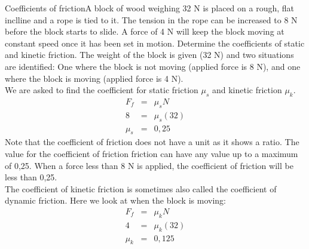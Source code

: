 \begin{wex}{Coefficients of friction}{A block of wood weighing 32 N is placed on a rough, flat inclline and a rope is tied to it. The tension in the rope can be increased to 8 N before the block starts to slide. A force of 4 N will keep the block moving at constant speed once it has been set in motion. Determine the coefficients of static and kinetic friction.}
{
The weight of the block is given (32 N) and two situations are identified: One where the block is not moving (applied force is 8 N), and one where the block is moving (applied force is 4 N). \\
We are asked to find the coefficient for static friction $\mu_s$ and kinetic friction $\mu_k$.\\
\begin{eqnarray*}
F_f &=& \mu_s N\\
8 &=& \mu_s (32)\\
\mu_s &=& 0,25
\end{eqnarray*}
Note that the coefficient of friction does not have a unit as it shows a ratio. The value for the coefficient of friction friction can have any value up to a maximum of 0,25. When a force less than 8 N is applied, the coefficient of friction will be less than 0,25.\\

The coefficient of kinetic friction is sometimes also called the coefficient of dynamic friction. Here we look at when the block is moving:
\begin{eqnarray*}
F_f &=& \mu_k N\\
4 &=& \mu_k (32)\\
\mu_k &=& 0,125
\end{eqnarray*}
}
\end{wex}



